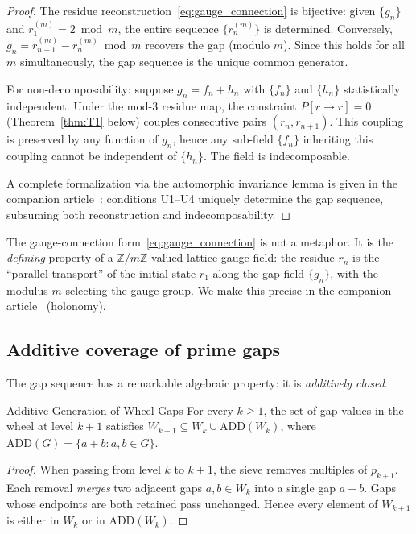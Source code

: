 \documentclass[12pt,a4paper]{article}
\begin{document}
\begin{proof}
The residue reconstruction~\eqref{eq:gauge_connection} is bijective:
given $\{g_n\}$ and $r_1^{(m)} = 2 \bmod m$, the entire sequence
$\{r_n^{(m)}\}$ is determined. Conversely, $g_n = r_{n+1}^{(m)} -
r_n^{(m)} \bmod m$ recovers the gap (modulo $m$). Since this holds
for all $m$ simultaneously, the gap sequence is the unique common
generator.

For non-decomposability: suppose $g_n = f_n + h_n$ with $\{f_n\}$ and
$\{h_n\}$ statistically independent. Under the mod-3 residue map, the
constraint $P[r \to r] = 0$ (Theorem~\ref{thm:T1} below) couples consecutive
pairs $(r_n, r_{n+1})$. This coupling is preserved by any function of
$g_n$, hence any sub-field $\{f_n\}$ inheriting this coupling cannot
be independent of $\{h_n\}$. The field is indecomposable.

A complete formalization via the automorphic invariance lemma is given
in the companion article~\cite{companion_M3}: conditions U1--U4 uniquely determine the gap
sequence, subsuming both reconstruction and indecomposability.
\end{proof}

\begin{remark}
The gauge-connection form~\eqref{eq:gauge_connection} is not a
metaphor. It is the \emph{defining} property of a $\mathbb{Z}/m\mathbb{Z}$-valued
lattice gauge field: the residue $r_n$ is the ``parallel transport''
of the initial state $r_1$ along the gap field $\{g_n\}$, with the
modulus $m$ selecting the gauge group. We make this precise in
the companion article~\cite{companion_M2} (holonomy).
\end{remark}

\subsection{Additive coverage of prime gaps}
\label{sec:ch1_coverage}

The gap sequence has a remarkable algebraic property: it is
\emph{additively closed}.

\begin{thmbox}{Additive Generation of Wheel Gaps}
\label{thm:wheel_coverage}
For every $k \geq 1$, the set of gap values in the wheel at
level $k{+}1$ satisfies
$W_{k+1} \subseteq W_k \cup \mathrm{ADD}(W_k)$,
where $\mathrm{ADD}(G) = \{a + b : a, b \in G\}$.

\begin{proof}
When passing from level $k$ to $k{+}1$, the sieve removes
multiples of $p_{k+1}$.  Each removal \emph{merges} two adjacent
gaps $a, b \in W_k$ into a single gap $a + b$.  Gaps whose
endpoints are both retained pass unchanged.  Hence every element
of $W_{k+1}$ is either in $W_k$ or in $\mathrm{ADD}(W_k)$.
\end{proof}
\end{thmbox}
\end{document}
